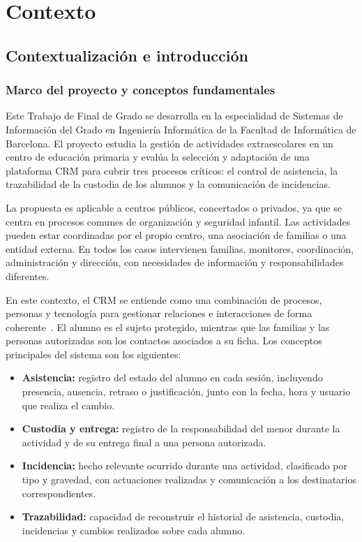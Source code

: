 
\chapter{Contexto}\label{sec:1}

\section{Contextualización e introducción}\label{sec:1-1}

\subsection{Marco del proyecto y conceptos fundamentales}\label{sec:1-1-1}

Este Trabajo de Final de Grado se desarrolla en la especialidad de Sistemas de Información del Grado en Ingeniería Informática de la Facultad de Informática de Barcelona. El proyecto estudia la gestión de actividades extraescolares en un centro de educación primaria y evalúa la selección y adaptación de una plataforma CRM para cubrir tres procesos críticos: el control de asistencia, la trazabilidad de la custodia de los alumnos y la comunicación de incidencias.

La propuesta es aplicable a centros públicos, concertados o privados, ya que se centra en procesos comunes de organización y seguridad infantil. Las actividades pueden estar coordinadas por el propio centro, una asociación de familias o una entidad externa. En todos los casos intervienen familias, monitores, coordinación, administración y dirección, con necesidades de información y responsabilidades diferentes.

En este contexto, el CRM se entiende como una combinación de procesos, personas y tecnología para gestionar relaciones e interacciones de forma coherente~\cite{ref01}. El alumno es el sujeto protegido, mientras que las familias y las personas autorizadas son los contactos asociados a su ficha. Los conceptos principales del sistema son los siguientes:

\begin{itemize}
  \item \textbf{Asistencia:} registro del estado del alumno en cada sesión, incluyendo presencia, ausencia, retraso o justificación, junto con la fecha, hora y usuario que realiza el cambio.
  \item \textbf{Custodia y entrega:} registro de la responsabilidad del menor durante la actividad y de su entrega final a una persona autorizada.
  \item \textbf{Incidencia:} hecho relevante ocurrido durante una actividad, clasificado por tipo y gravedad, con actuaciones realizadas y comunicación a los destinatarios correspondientes.
  \item \textbf{Trazabilidad:} capacidad de reconstruir el historial de asistencia, custodia, incidencias y cambios realizados sobre cada alumno.
\end{itemize}

